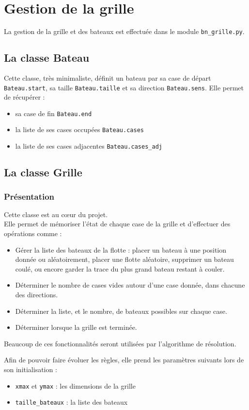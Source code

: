 \chapter{Gestion de la grille}\label{chap_grille}

La gestion de la grille et des bateaux est effectuée dans le module \texttt{bn\_grille.py}.

\section{La classe Bateau}
Cette classe, très minimaliste, définit un bateau par sa case de départ \texttt{Bateau.start}, sa taille \texttt{Bateau.taille} et sa direction \texttt{Bateau.sens}. Elle permet de récupérer :
\begin{itemize}
\item sa case de fin \texttt{Bateau.end}
\item la liste de ses cases occupées \texttt{Bateau.cases}
\item la liste de ses cases adjacentes \texttt{Bateau.cases\_adj}
\end{itemize}

\section{La classe Grille}
\subsection{Présentation}
Cette classe est au c\oe ur du projet. \\
Elle permet de mémoriser l'état de chaque case de la grille et d'effectuer des opérations comme :
\begin{itemize}
\item Gérer la liste des bateaux de la flotte : placer un bateau à une position donnée ou aléatoirement, placer une flotte aléatoire, supprimer un bateau coulé, ou encore garder la trace du plus grand bateau restant à couler.
\item Déterminer le nombre de cases vides autour d'une case donnée, dans chacune des directions.
\item Déterminer la liste, et le nombre, de bateaux possibles sur chaque case.
\item Déterminer lorsque la grille est terminée.
\end{itemize}
Beaucoup de ces fonctionnalités seront utilisées par l'algorithme de résolution.

Afin de pouvoir faire évoluer les règles, elle prend les paramètres suivants lors de son initialisation :
\begin{itemize}
\item \texttt{xmax} et \texttt{ymax} : les dimensions de la grille
\item \texttt{taille\_bateaux} : la liste des bateaux
\end{itemize}
\medskip

